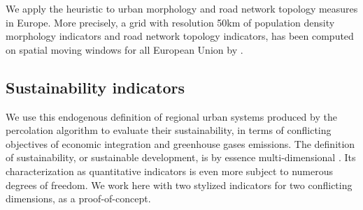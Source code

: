 \documentclass{jimis-en}
\begin{document}
We apply the heuristic to urban morphology and road network topology measures in Europe. More precisely, a grid with resolution 50km of population density morphology indicators and road network topology indicators, has been computed on spatial moving windows for all European Union by \cite{raimbault2018urban}.












\subsection{Sustainability indicators}


We use this endogenous definition of regional urban systems produced by the percolation algorithm to evaluate their sustainability, in terms of conflicting objectives of economic integration and greenhouse gases emissions. The definition of sustainability, or sustainable development, is by essence multi-dimensional \citep{viguie2012trade}. Its characterization as quantitative indicators is even more subject to numerous degrees of freedom. We work here with two stylized indicators for two conflicting dimensions, as a proof-of-concept.
\end{document}
